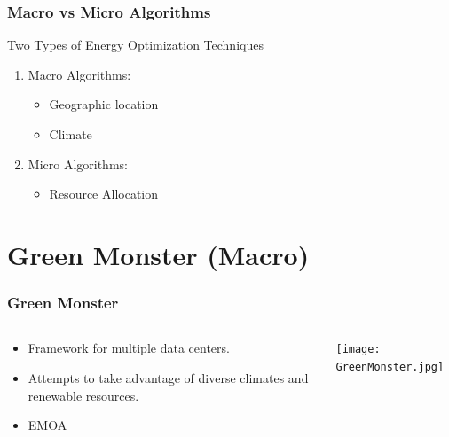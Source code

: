 \documentclass{beamer}
\begin{document}
\begin{frame}
  \frametitle{Macro vs Micro Algorithms}
 	Two Types of Energy Optimization Techniques
 		\begin{enumerate}
 			\item Macro Algorithms:
 				\begin{itemize}
 					\item Geographic location
 					\item Climate
 					\linebreak
 				\end{itemize}
 			\item Micro Algorithms:
 				\begin{itemize}
 					\item Resource Allocation
 				\end{itemize}
 		\end{enumerate}

\end{frame}

\section[Green Monster]{Green Monster (Macro)}

\begin{frame}
	\frametitle{Green Monster}
\begin{columns}
\begin{column}{0.55\textwidth}
	\begin{itemize}
	\item Framework for multiple data centers.
	\linebreak
	\item Attempts to take advantage of diverse climates and renewable resources.
	\linebreak
	\item EMOA
	\end{itemize}

\end{column}
	\begin{column}{0.45\textwidth}
	\texttt{[image: GreenMonster.jpg]} \\
\end{column}
\end{columns}
\end{frame}
\end{document}
